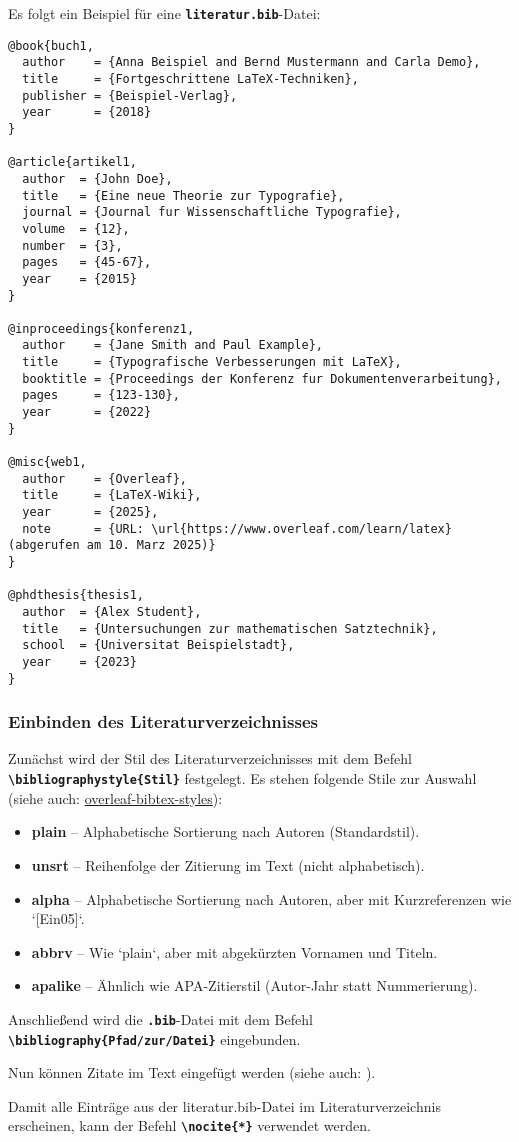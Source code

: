 Es folgt ein Beispiel für eine \textbf{\texttt{literatur.bib}}-Datei:

\begin{lstlisting}[language={[LaTeX]TeX}]
@book{buch1,
  author    = {Anna Beispiel and Bernd Mustermann and Carla Demo},
  title     = {Fortgeschrittene LaTeX-Techniken},
  publisher = {Beispiel-Verlag},
  year      = {2018}
}

@article{artikel1,
  author  = {John Doe},
  title   = {Eine neue Theorie zur Typografie},
  journal = {Journal fur Wissenschaftliche Typografie},
  volume  = {12},
  number  = {3},
  pages   = {45-67},
  year    = {2015}
}

@inproceedings{konferenz1,
  author    = {Jane Smith and Paul Example},
  title     = {Typografische Verbesserungen mit LaTeX},
  booktitle = {Proceedings der Konferenz fur Dokumentenverarbeitung},
  pages     = {123-130},
  year      = {2022}
}

@misc{web1,
  author    = {Overleaf},
  title     = {LaTeX-Wiki},
  year      = {2025},
  note      = {URL: \url{https://www.overleaf.com/learn/latex} (abgerufen am 10. Marz 2025)}
}

@phdthesis{thesis1,
  author  = {Alex Student},
  title   = {Untersuchungen zur mathematischen Satztechnik},
  school  = {Universitat Beispielstadt},
  year    = {2023}
}
\end{lstlisting}

\subsubsection{Einbinden des Literaturverzeichnisses}
Zunächst wird der Stil des Literaturverzeichnisses mit dem Befehl \textbf{\texttt{\textbackslash bibliographystyle\{Stil\}}} festgelegt.
Es stehen folgende Stile zur Auswahl (siehe auch: \href{https://www.overleaf.com/learn/latex/Bibtex_bibliography_styles}{overleaf-bibtex-styles}):
\begin{itemize}
  \item \textbf{plain} – Alphabetische Sortierung nach Autoren (Standardstil).
  \item \textbf{unsrt} – Reihenfolge der Zitierung im Text (nicht alphabetisch).
  \item \textbf{alpha} – Alphabetische Sortierung nach Autoren, aber mit Kurzreferenzen wie `[Ein05]`.
  \item \textbf{abbrv} – Wie `plain`, aber mit abgekürzten Vornamen und Titeln.
  \item \textbf{apalike} – Ähnlich wie APA-Zitierstil (Autor-Jahr statt Nummerierung).
\end{itemize}

Anschließend wird die \textbf{\texttt{.bib}}-Datei mit dem Befehl \textbf{\texttt{\textbackslash bibliography\{Pfad/zur/Datei\}}} eingebunden.

Nun können Zitate im Text eingefügt werden (siehe auch: ).

Damit alle Einträge aus der literatur.bib-Datei im Literaturverzeichnis erscheinen, kann der Befehl \textbf{\texttt{\textbackslash nocite\{*\}}} verwendet werden.